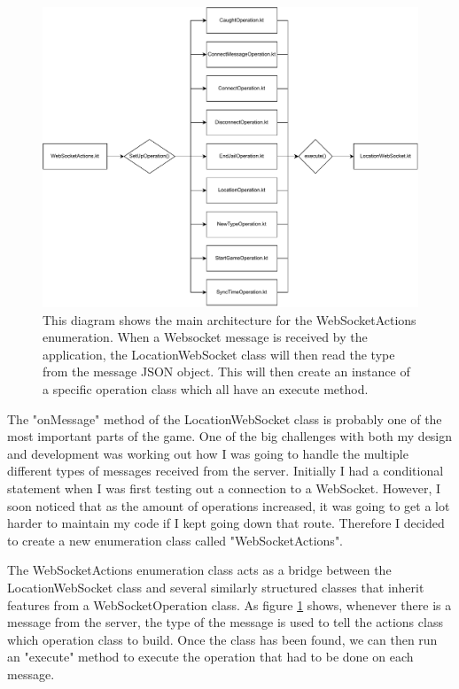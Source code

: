 \documentclass{l4proj}
\begin{document}
\begin{figure}
    \centering
    \includegraphics[width=\linewidth]{images/LocationActionsEnumDiagram.pdf}    

    \caption{
        This diagram shows the main architecture for the WebSocketActions enumeration. When a
        Websocket message is received by the application, the LocationWebSocket class will then
        read the type from the message JSON object. This will then create an instance of a specific
        operation class which all have an execute method.   
    }

    \label{fig:locationActions} 
\end{figure}

The "onMessage" method of the LocationWebSocket class is probably one of the most important parts of the game.
One of the big challenges with both my design and development was working out how I was going to handle the multiple
different types of messages received from the server. Initially I had a conditional statement when I was first
testing out a connection to a WebSocket. However, I soon noticed that as the amount of operations increased, it
was going to get a lot harder to maintain my code if I kept going down that route. Therefore I decided to create
a new enumeration class called "WebSocketActions".

The WebSocketActions enumeration class acts as a bridge between the LocationWebSocket class and several similarly
structured classes that inherit features from a WebSocketOperation class. As figure \ref{fig:locationActions} shows, 
whenever there is a message from the server, the type of the message is used to tell the actions class which operation
class to build. Once the class has been found, we can then run an "execute" method to execute the operation that had
to be done on each message.
\end{document}
